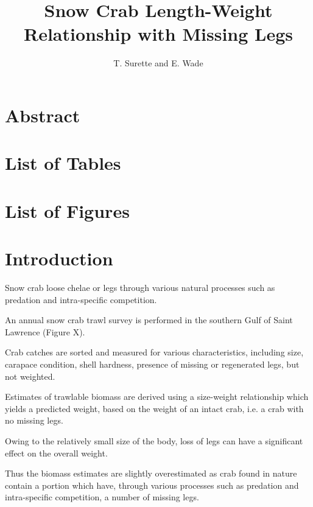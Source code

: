 \documentclass[letterpaper,10pt]{article}
\title{Snow Crab Length-Weight Relationship with Missing Legs}
\author{T. Surette and E. Wade}
\begin{document}
\maketitle 

\tableofcontents
\newpage


\section*{Abstract}



\newpage

\section*{List of Tables}
\renewcommand\listtablename{}
\listoftables
\newpage

\section*{List of Figures}
\renewcommand\listfigurename{}
\listoffigures
\newpage


\section{Introduction}

Snow crab loose chelae or legs through various natural processes such as predation and intra-specific competition. 

An annual snow crab trawl survey is performed in the southern Gulf of Saint Lawrence (Figure X). 

Crab catches are sorted and measured for various characteristics, including size, carapace condition, shell hardness, presence of missing or regenerated legs, but not weighted.

Estimates of trawlable biomass are derived using a size-weight relationship which yields a predicted weight, based on the weight of an intact crab, i.e. a crab with no missing legs.

Owing to the relatively small size of the body, loss of legs can have a significant effect on the overall weight.

Thus the biomass estimates are slightly overestimated as crab found in nature contain a portion which have, through various processes such as predation and intra-specific competition, a number of missing legs.
\end{document}
